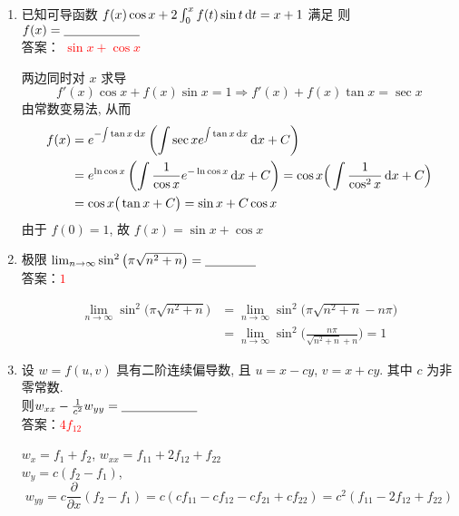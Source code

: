 \documentclass[11pt,twoside,space]{ctexart}
\begin{document}
\section{}
\begin{enumerate}[labelsep=-1em,leftmargin=1.4em,align=left]
\item 已知可导函数 $f(x)\cos x+2\int_0^xf(t)\sin t\mathop{}\!\mathrm{d} t=x+1$ 满足
则 $f(x)=\underline{\hspace*{6em}}$\\[2mm]
{\kaishu 答案}： \textcolor{red}{$\sin x+\cos x$}
\begin{Solution}
两边同时对 $x$ 求导\[f'(x)\cos x+f(x)\sin x=1\Longrightarrow f'(x)+f(x)\tan x=\sec x\]
由常数变易法, 从而\begin{align*}
f(x)&=e^{-\scaleobj{0.55}{\displaystyle\int}\tan x\dif x}\left(\int\sec xe^{\scaleobj{0.55}{\displaystyle\int}\tan x\dif x}\dif x+C\right)\\
&=e^{\ln\cos x}\left(\int\frac{1}{\cos x}e^{-\ln\cos x}\dif x+C\right)=\cos x\Big(\int\frac{1}{\cos^2x}\dif x+C\Big)\\
&=\cos x\big(\tan x+C\big)=\sin x+C\cos x
\end{align*}
由于 $f(0)=1$, 故 $f(x)=\sin x+\cos x$
\end{Solution}
\item 极限 $\lim_{n\to\infty}\sin^2\big(\pi\sqrt{n^2+n}\big)=\underline{\hspace*{4em}}$\\[2mm]
{\kaishu 答案}：\textcolor{red}{$1$}
\begin{Solution}\quad\vspace*{-2em}
\begin{align*}
\lim_{n\to\infty}\sin^2\big(\pi\sqrt{n^2+n}\big)
&=\lim_{n\to\infty}\sin^2\big(\pi\sqrt{n^2+n}-n\pi\big)\\
&=\lim_{n\to\infty}\sin^2\bigg(\frac{n\pi}{\sqrt{n^2+n}+n}\bigg)=1
\end{align*}
\end{Solution}
\newpage
\item 设 $w=f(u,v)$ 具有二阶连续偏导数, 且 $u=x-cy$, $v=x+cy$. 其中 $c$ 为非零常数.\\
则$w_{xx}-\frac{1}{c^2}w_{yy}=\underline{\hspace*{6em}}$\\[2mm]
{\kaishu 答案}：\textcolor{red}{$4f_{12}$}
\begin{Solution}
$w_x=f_1+f_2$, $w_{xx}=f_{11}+2f_{12}+f_{22}$\\
$w_y=c(f_2-f_1)$,\[w_{yy}=c\frac{\partial}{\partial x}(f_2-f_1)=c(cf_{11}-cf_{12}-cf_{21}+cf_{22})=c^2(f_{11}-2f_{12}+f_{22})\]

\end{Solution}
\end{enumerate}
\end{document}
